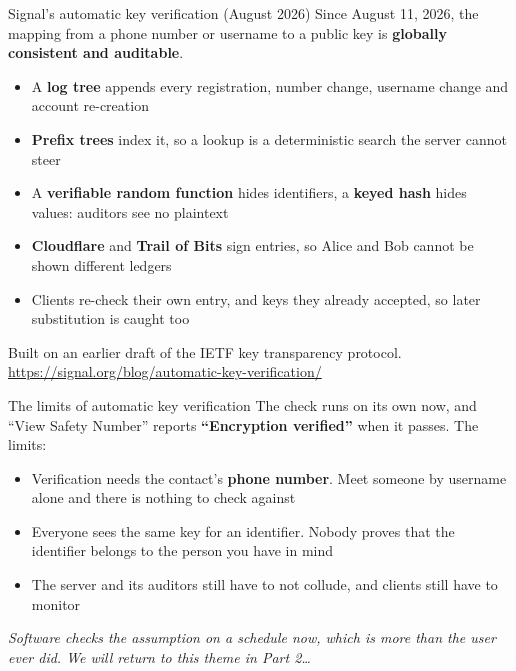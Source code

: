 \ifdefined\PRESENTATION\else\PassOptionsToClass{handout}{beamer}\fi\documentclass[aspectratio=169, lualatex]{beamer}
\begin{document}
\begin{frame}{Signal's automatic key verification (August 2026)}
	\footnotesize
	Since August 11, 2026, the mapping from a phone number or username to a public key is \textbf{globally consistent and auditable}.
	\vspace{0.3em}
	\begin{itemize}
		\item A \textbf{log tree} appends every registration, number change, username change and account re-creation
		\item \textbf{Prefix trees} index it, so a lookup is a deterministic search the server cannot steer
		\item A \textbf{verifiable random function} hides identifiers, a \textbf{keyed hash} hides values: auditors see no plaintext
		\item \textbf{Cloudflare} and \textbf{Trail of Bits} sign entries, so Alice and Bob cannot be shown different ledgers
		\item Clients re-check their own entry, and keys they already accepted, so later substitution is caught too
	\end{itemize}
	\vspace{0.3em}
	\begin{center}
		\scriptsize
		Built on an earlier draft of the IETF key transparency protocol. \url{https://signal.org/blog/automatic-key-verification/}
	\end{center}
\end{frame}

\begin{frame}{The limits of automatic key verification}
	\small
	The check runs on its own now, and ``View Safety Number'' reports \textbf{``Encryption verified''} when it passes. The limits:
	\vspace{0.4em}
	\begin{itemize}
		\item Verification needs the contact's \textbf{phone number}. Meet someone by username alone and there is nothing to check against
		\item Everyone sees the same key for an identifier. Nobody proves that the identifier belongs to the person you have in mind
		\item The server and its auditors still have to not collude, and clients still have to monitor
	\end{itemize}
	\vspace{0.4em}
	\begin{center}
		\textit{Software checks the assumption on a schedule now, which is more than the user ever did. We will return to this theme in Part 2\ldots}
	\end{center}
\end{frame}
\end{document}
